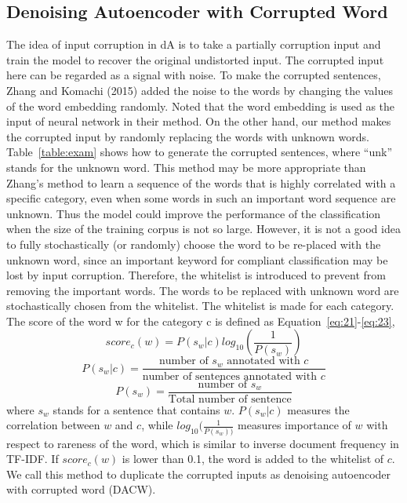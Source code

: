 \subsection{Denoising Autoencoder with Corrupted Word}

The idea of input corruption in dA is to take a partially corruption 
input and train the model to recover the original undistorted input.
The corrupted input here can be regarded as a signal with noise. 
To make the corrupted sentences, Zhang and Komachi (2015) \cite{zhang2015japanese}
added the noise to the words by changing the values of the 
word embedding randomly. 
Noted that the word embedding is used as the input 
of neural network in their method. 
On the other hand, our method makes the corrupted input by randomly
replacing the words with unknown words. 
Table~\ref{table:exam} shows how to generate the corrupted
sentences, where ``unk'' stands for the unknown word. 
This method may be more appropriate than Zhang's method to learn a 
sequence of the words that is highly correlated with a specific category, 
even when some words in such an important word sequence are unknown. 
Thus the model could improve the performance of the classification
when the size of the training corpus is not so large.
However, it is not a good idea to fully stochastically (or randomly) 
choose the word to be re-placed with the unknown word, 
since an important keyword for compliant classification 
may be lost by input corruption. 
Therefore, the whitelist is introduced to prevent from 
removing the important words. The words to be replaced with 
unknown word are stochastically chosen from the whitelist. 
The whitelist is made for each category. 
The score of the word w for the category c is defined as Equation~\ref{eq:21}-\ref{eq:23},
\begin{equation}
score_c(w)=P(s_w | c) log_{10}( \frac{1}{P(s_w)})
\label{eq:21}
\end{equation}
\begin{equation}
P(s_w|c)=\frac{\text{number of } s_w  \text{ annotated with } c}{\text{number of sentences annotated with } c}
\label{eq:22}
\end{equation}
\begin{equation}
P(s_w)=\frac{\text{number of } s_w}{\text{Total number of sentence}}
\label{eq:23}
\end{equation}
where $s_w$ stands for a sentence that contains $w$. $P(s_w|c)$ measures 
the correlation between $w$ and $c$, while $log_{10} (\frac{1}{P(s_w))}$ measures 
importance of $w$ with respect to rareness of the word, 
which is similar to inverse document frequency in TF-IDF.
If $score_c(w)$ is lower than 0.1, the word is added to the whitelist of $c$.
We call this method to duplicate the corrupted inputs as denoising autoencoder 
with corrupted word (DACW).


